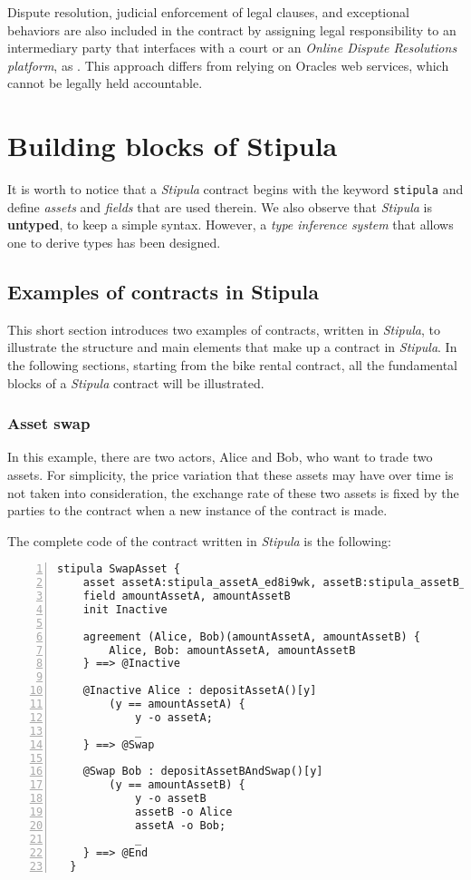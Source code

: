 Dispute resolution, judicial enforcement of legal clauses, and exceptional behaviors are also included in 
the contract by assigning legal responsibility to an intermediary party that interfaces with a court or an 
\textit{Online Dispute Resolutions platform}, as \cite{site:eu-odr-platform}. This approach differs from 
relying on Oracles web services, which cannot be legally held accountable.

\section{Building blocks of Stipula}

It is worth to notice that a \textit{Stipula} contract begins with the keyword \verb|stipula| and define 
\textit{assets} and \textit{fields} that are used therein. We also observe that \textit{Stipula} is 
\textbf{untyped}, to keep a simple syntax. However, a \textit{type inference system} that allows one to 
derive types has been designed.

\subsection{Examples of contracts in Stipula}

This short section introduces two examples of contracts, written in \textit{Stipula}, to illustrate the 
structure and main elements that make up a contract in \textit{Stipula}. In the following sections, 
starting from the bike rental contract, all the fundamental blocks of a \textit{Stipula} contract will be 
illustrated.

\subsubsection{Asset swap}

In this example, there are two actors, Alice and Bob, who want to trade two assets. For simplicity, the 
price variation that these assets may have over time is not taken into consideration, the exchange rate of 
these two assets is fixed by the parties to the contract when a new instance of the contract is made.

The complete code of the contract written in \textit{Stipula} is the following:
\begin{Verbatim}[numbers=left,xleftmargin=1cm,firstnumber=1,breaklines=true,tabsize=2]
  stipula SwapAsset {
    asset assetA:stipula_assetA_ed8i9wk, assetB:stipula_assetB_pl1n5cc
    field amountAssetA, amountAssetB
    init Inactive

    agreement (Alice, Bob)(amountAssetA, amountAssetB) {
        Alice, Bob: amountAssetA, amountAssetB
    } ==> @Inactive

    @Inactive Alice : depositAssetA()[y]
        (y == amountAssetA) {
            y -o assetA;
            _
    } ==> @Swap

    @Swap Bob : depositAssetBAndSwap()[y]
        (y == amountAssetB) {
            y -o assetB
            assetB -o Alice
            assetA -o Bob;
            _
    } ==> @End
  }
\end{Verbatim}

